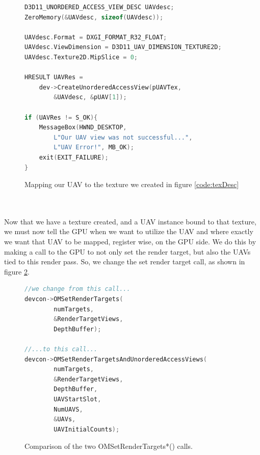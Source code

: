 \documentclass[a4paper, 12pt]{article}
\begin{document}

\begin{figure}[h]
\begin{lstlisting}[language=C++]
D3D11_UNORDERED_ACCESS_VIEW_DESC UAVdesc;
ZeroMemory(&UAVdesc, sizeof(UAVdesc));

UAVdesc.Format = DXGI_FORMAT_R32_FLOAT;
UAVdesc.ViewDimension = D3D11_UAV_DIMENSION_TEXTURE2D;
UAVdesc.Texture2D.MipSlice = 0;

HRESULT UAVRes = 
	dev->CreateUnorderedAccessView(pUAVTex, 
		&UAVdesc, &pUAV[1]);

if (UAVRes != S_OK){
	MessageBox(HWND_DESKTOP, 
		L"Our UAV view was not successful...", 
		L"UAV Error!", MB_OK);
	exit(EXIT_FAILURE);
}
\end{lstlisting}
\caption{Mapping our UAV to the texture we created in figure \ref{code:texDesc}}
\label{code:mapUAVtoTex}
\end{figure}

\noindent \\ \\  Now that we have a texture created, and a UAV instance bound
to that texture, we must now tell the GPU when we want to utilize the UAV and
where exactly we want that UAV to be mapped, register wise, on the GPU side.
We do this by making a call to the GPU to not only set the render target, but
also the UAVs tied to this render pass. So, we change the set render target
call, as shown in figure \ref{code:setRTV}.

\begin{figure}[h]
\begin{lstlisting}[language=C++]
//we change from this call...
devcon->OMSetRenderTargets(
		numTargets, 
		&RenderTargetViews, 
		DepthBuffer);

//...to this call...
devcon->OMSetRenderTargetsAndUnorderedAccessViews(
		numTargets,
		&RenderTargetViews,
		DepthBuffer,
		UAVStartSlot,
		NumUAVS,
		&UAVs,
		UAVInitialCounts);
\end{lstlisting}
\caption{Comparison of the two OMSetRenderTargets*() calls.}
\label{code:setRTV}
\end{figure}
\end{document}
